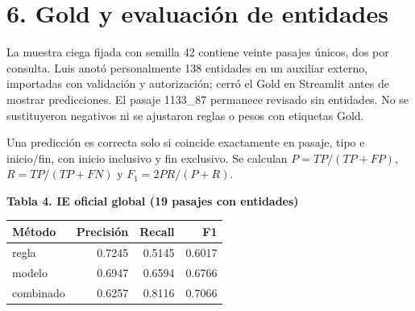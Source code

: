 \documentclass[11pt,a4paper]{article}
\begin{document}
\section*{6. Gold y evaluación de entidades}
\par
La muestra ciega fijada con semilla 42 contiene veinte pasajes únicos, dos por consulta. Luis anotó personalmente 138 entidades en un auxiliar externo, importadas con validación y autorización; cerró el Gold en Streamlit antes de mostrar predicciones. El pasaje 1133\_\allowbreak{}87 permanece revisado sin entidades. No se sustituyeron negativos ni se ajustaron reglas o pesos con etiquetas Gold.
\par
Una predicción es correcta solo si coincide exactamente en pasaje, tipo e inicio/\allowbreak{}fin, con inicio inclusivo y fin exclusivo. Se calculan $P=TP/(TP+FP)$, $R=TP/(TP+FN)$ y $F_1=2PR/(P+R)$.
\par
\par\medskip\noindent\begin{minipage}{\linewidth}
\textbf{Tabla 4. IE oficial global (19 pasajes con entidades)}\par\smallskip
\begin{tabularx}{\linewidth}{@{}Yrrr@{}}\toprule
Método & Precisión & Recall & F1 \\ \midrule
regla & 0.7245 & 0.5145 & 0.6017 \\
modelo & 0.6947 & 0.6594 & 0.6766 \\
combinado & 0.6257 & 0.8116 & 0.7066 \\
\bottomrule\end{tabularx}\end{minipage}\par\medskip
\par
\end{document}
